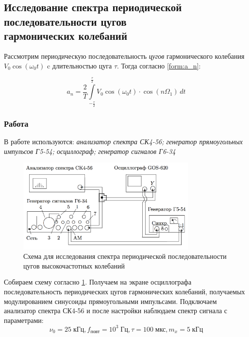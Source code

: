 \documentclass[a4paper, 12pt]{article}
\begin{document}
\subsection*{Исследование спектра периодической последовательности цугов \\ гармонических колебаний}

Рассмотрим периодическую последовательность {\it{цугов}} гармонического колебания \\
$V_0 \cos (\omega_0 t)$ c длительностью цуга $\tau$.
Тогда согласно \ref{form:a_n}:

\begin{equation}
\label{form:cug_a_n}
a_n = \frac{2}{T}\int\limits_{ -\frac{\tau}{2} } ^ {\frac{\tau}{2} } V_0\cos(\omega_0t)\cdot \cos(n\Omega_1)\, dt
\end{equation}

\subsubsection*{Работа}

В работе используются: \textit{анализатор спектра СК4-56; генератор прямоугольных импульсов Г5-54; осциллограф; генератор сигналов Г6-34}

\begin{figure}[H]
\centering
\includegraphics[width = 0.8\textwidth]{SchemeB}
\caption{Схема для исследования спектра периодической последовательности цугов высокочастотных колебаний}
\label{img:scheme B}
\end{figure}

Собираем схему согласно \ref{img:scheme B}. Получаем на экране осциллографа последовательность периодических цугов гармонических колебаний, получаемых модулированием синусоиды прямоугольными импульсами. Подключаем анализатор спектра СК4-56 и после настройки наблюдаем спектр сигнала с параметрами: $$ \nu_0 = 25 \; \text{кГц}, f_\text{повт} = 10^3 \; \text{Гц}, \tau = 100 \; \text{мкс}, m_x = 5 \; \text{кГц}$$
\end{document}
